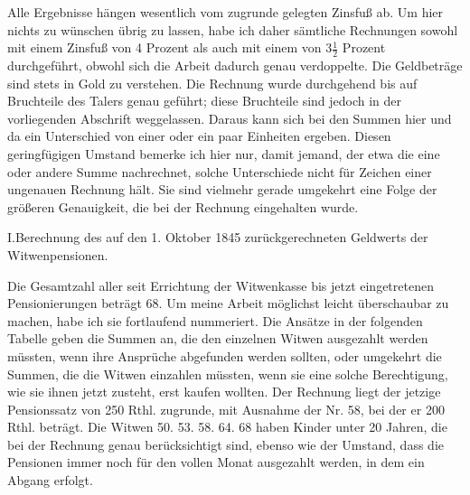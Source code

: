 Alle Ergebnisse hängen wesentlich vom zugrunde gelegten Zinsfuß ab. Um hier nichts zu wünschen übrig zu lassen, habe ich daher sämtliche Rechnungen sowohl mit einem Zinsfuß von 4 Prozent als auch mit einem von \(3\tfrac{1}{2}\) Prozent durchgeführt, obwohl sich die Arbeit dadurch genau verdoppelte. Die Geldbeträge sind stets in Gold zu verstehen. Die Rechnung wurde durchgehend bis auf Bruchteile des Talers genau geführt; diese Bruchteile sind jedoch in der vorliegenden Abschrift weggelassen. Daraus kann sich bei den Summen hier und da ein Unterschied von einer oder ein paar Einheiten ergeben. Diesen geringfügigen Umstand bemerke ich hier nur, damit jemand, der etwa die eine oder andere Summe nachrechnet, solche Unterschiede nicht für Zeichen einer ungenauen Rechnung hält. Sie sind vielmehr gerade umgekehrt eine Folge der größeren Genauigkeit, die bei der Rechnung eingehalten wurde.

\par\medskip\noindent I.\quad Berechnung des auf den 1. Oktober 1845 zurückgerechneten Geldwerts der Witwenpensionen.\par\smallskip
Die Gesamtzahl aller seit Errichtung der Witwenkasse bis jetzt eingetretenen Pensionierungen beträgt 68. Um meine Arbeit möglichst leicht überschaubar zu machen, habe ich sie fortlaufend nummeriert. Die Ansätze in der folgenden Tabelle geben die Summen an, die den einzelnen Witwen ausgezahlt werden müssten, wenn ihre Ansprüche abgefunden werden sollten, oder umgekehrt die Summen, die die Witwen einzahlen müssten, wenn sie eine solche Berechtigung, wie sie ihnen jetzt zusteht, erst kaufen wollten. Der Rechnung liegt der jetzige Pensionssatz von 250 Rthl. zugrunde, mit Ausnahme der Nr. 58, bei der er 200 Rthl. beträgt. Die Witwen 50. 53. 58. 64. 68 haben Kinder unter 20 Jahren, die bei der Rechnung genau berücksichtigt sind, ebenso wie der Umstand, dass die Pensionen immer noch für den vollen Monat ausgezahlt werden, in dem ein Abgang erfolgt.

